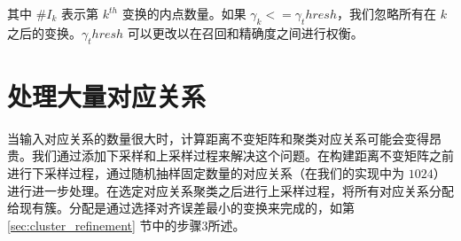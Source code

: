 其中 $\#I_k$ 表示第 $k^{th}$ 变换的内点数量。如果 $\gamma_k <= \gamma_thresh$，我们忽略所有在 $k$ 之后的变换。$\gamma_thresh$ 可以更改以在召回和精确度之间进行权衡。

\section{处理大量对应关系}
当输入对应关系的数量很大时，计算距离不变矩阵和聚类对应关系可能会变得昂贵。我们通过添加下采样和上采样过程来解决这个问题。在构建距离不变矩阵之前进行下采样过程，通过随机抽样固定数量的对应关系（在我们的实现中为 $1024$）进行进一步处理。在选定对应关系聚类之后进行上采样过程，将所有对应关系分配给现有簇。分配是通过选择对齐误差最小的变换来完成的，如第 \ref{sec:cluster_refinement} 节中的步骤3所述。